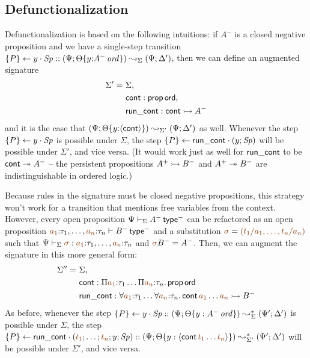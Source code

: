 \subsection{Defunctionalization}
\label{sec:defunc-defunc}

Defunctionalization is based on the following intuitions:
if $A^-$ is a closed negative proposition
and we have a single-step transition 
$\{{P}\} \leftarrow {y} \cdot {{\it Sp}} :: (\Psi; {\Theta}\{{y{:}{A^-}\,{{\it ord}}}\}) 
 \leadsto_{\Sigma} 
 (\Psi; \Delta')$,
then we can define an augmented signature
\begin{align*}
\Sigma' = ~ & \Sigma, 
\\    ~~ & {\sf cont} : {\sf prop\,ord}, 
\\    ~~ & {\sf run\_cont} : {\sf cont} \rightarrowtail A^-
\end{align*}
and it is the case that 
$(\Psi; {\Theta}\{{y{:}\langle {\sf cont} \rangle}\}) 
 \leadsto_{\Sigma'} 
 (\Psi; \Delta')$
as well. Whenever the step $\{{P}\} \leftarrow {y} \cdot {{\it Sp}}$ is possible under $\Sigma$,
the step $\{{P}\} \leftarrow {\sf run\_cont} \cdot {(y; {\it Sp})}$ will be possible under $\Sigma'$,
and vice versa.  (It would work just as well for ${\sf run\_cont}$ to be ${\sf
  cont} \twoheadrightarrow A^-$ -- the persistent propositions $A^+ \rightarrowtail
B^-$ and $A^+
\twoheadrightarrow B^-$ are indistinguishable in ordered logic.)

Because rules in the signature must be closed negative propositions,
this strategy won't work for a transition that mentions free variables
from the context. However, every open proposition $\Psi \vdash_\Sigma
A^-\,{\sf type}^-$ can be refactored as an open proposition 
$\lf{a_1}{:}\tau_1, \ldots, \lf{a_n}{:}\tau_n \vdash B^-\,{\sf type}^-$ and
a substitution $\lf{\sigma} = \lf{(t_1/a_1, \ldots, t_n/a_n)}$ such that
$\Psi \vdash_\Sigma \lf{\sigma} : \lf{a_1}{:}\tau_1, \ldots, \lf{a_n}{:}\tau_n$
and $\lf{\sigma}B^- = A^-$. Then, we can augment the signature in this 
more general form:
\begin{align*}
\Sigma'' = ~ & \Sigma, 
\\    ~~ & {\sf cont} :  \Pi\lf{a_1}{:}\tau_1\ldots \Pi\lf{a_n}{:}\tau_n.\,{\sf prop}\,{\sf ord}
\\    ~~ & {\sf run\_cont} : \forall\lf{a_1}{:}\tau_1\ldots \forall\lf{a_n}{:}\tau_n.\,{\sf cont}\,\lf{a_1}\ldots\lf{a_n} \lefti B^-
\end{align*}
As before, whenever the step $\{{P}\} \leftarrow {y} \cdot {{\it Sp}} :: (\Psi;
{\Theta}\{{y : {A^-}\,{{\it ord}}}\}) \leadsto^*_{\Sigma} (\Psi';
\Delta')$ is possible under $\Sigma$, the step $\tstep{P}{\sf
  run\_cont}{(\lf{t_1}; \ldots; \lf{t_n}; y; \Sp)} ::
  (\Psi; \tackon{\Theta}{y : \susp{{\sf cont}\,\lf{t_1}\ldots\lf{t_n}}}) \leadsto^*_{\Sigma'} (\Psi';
\Delta')$ will be possible under
$\Sigma'$, and vice versa.

